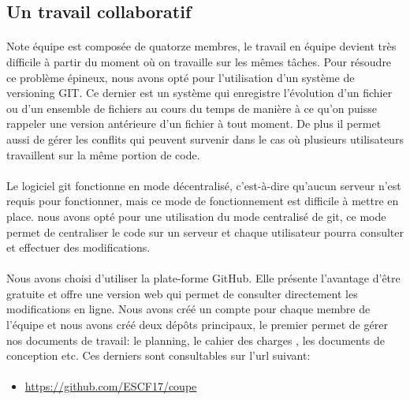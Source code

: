 \documentclass[12pt,a4paper]{article}
\begin{document}
\newpage

\subsection{Un travail collaboratif}

\paragraph{}
Note équipe est composée de quatorze membres, le travail en équipe devient très difficile à partir du moment où on travaille
sur les mêmes tâches. Pour résoudre ce problème épineux, nous avons opté pour 
l'utilisation d'un système de versioning GIT. Ce dernier est un système qui enregistre l'évolution d'un fichier ou d'un 
ensemble de fichiers au cours du temps de manière à ce qu'on puisse rappeler une version antérieure d'un fichier à tout moment.
De plus il permet aussi de gérer les conflits qui peuvent survenir dans le cas où plusieurs utilisateurs travaillent sur 
la même portion de code.

\paragraph{}
Le logiciel git fonctionne en mode décentralisé, c'est-à-dire qu'aucun serveur n'est requis pour fonctionner, mais ce mode 
de fonctionnement est difficile à mettre en place. nous avons opté pour une utilisation du mode centralisé de git, ce mode permet
de centraliser le code sur un serveur et chaque utilisateur pourra consulter et effectuer des modifications. 

\paragraph{}
Nous avons choisi d'utiliser la plate-forme GitHub.
Elle présente l'avantage d'être gratuite et offre une version web qui permet de 
consulter directement les modifications en ligne. Nous avons créé un compte pour chaque membre de l'équipe et nous avons créé 
deux dépôts principaux, le premier permet de gérer nos documents de travail: le planning, le cahier des charges , les documents 
de conception etc. Ces derniers sont consultables sur l'url suivant: 

\paragraph{}
\begin{itemize}
 \item \url{https://github.com/ESCF17/coupe}
\end{itemize}
\end{document}
